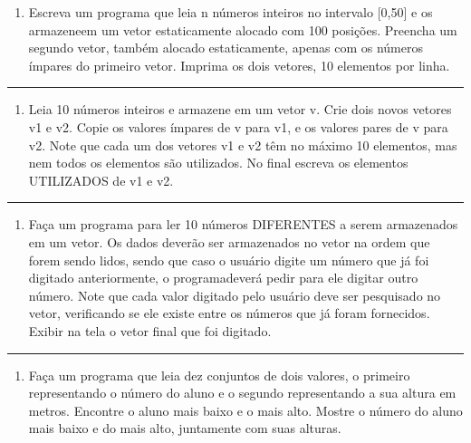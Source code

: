 \documentclass[12pt,a4paper]{article}
\renewcommand{\linethickness}{0.05em}
\providecommand{\tightlist}{%
      \setlength{\itemsep}{0pt}\setlength{\parskip}{0pt}}
\begin{document}
\begin{enumerate}
\def\labelenumi{\arabic{enumi}.}
\setcounter{enumi}{25}
\tightlist
\item
  Escreva um programa que leia n números inteiros no intervalo
  {[}0,50{]} e os armazeneem um vetor estaticamente alocado com 100
  posições. Preencha um segundo vetor, também alocado estaticamente,
  apenas com os números ímpares do primeiro vetor. Imprima os dois
  vetores, 10 elementos por linha.
\end{enumerate}

    \begin{center}\rule{0.5\linewidth}{\linethickness}\end{center}

\begin{enumerate}
\def\labelenumi{\arabic{enumi}.}
\setcounter{enumi}{26}
\tightlist
\item
  Leia 10 números inteiros e armazene em um vetor v. Crie dois novos
  vetores v1 e v2. Copie os valores ímpares de v para v1, e os valores
  pares de v para v2. Note que cada um dos vetores v1 e v2 têm no máximo
  10 elementos, mas nem todos os elementos são utilizados. No final
  escreva os elementos UTILIZADOS de v1 e v2.
\end{enumerate}

    \begin{center}\rule{0.5\linewidth}{\linethickness}\end{center}

\begin{enumerate}
\def\labelenumi{\arabic{enumi}.}
\setcounter{enumi}{27}
\tightlist
\item
  Faça um programa para ler 10 números DIFERENTES a serem armazenados em
  um vetor. Os dados deverão ser armazenados no vetor na ordem que forem
  sendo lidos, sendo que caso o usuário digite um número que já foi
  digitado anteriormente, o programadeverá pedir para ele digitar outro
  número. Note que cada valor digitado pelo usuário deve ser pesquisado
  no vetor, verificando se ele existe entre os números que já foram
  fornecidos. Exibir na tela o vetor final que foi digitado.
\end{enumerate}

    \begin{center}\rule{0.5\linewidth}{\linethickness}\end{center}

\begin{enumerate}
\def\labelenumi{\arabic{enumi}.}
\setcounter{enumi}{28}
\tightlist
\item
  Faça um programa que leia dez conjuntos de dois valores, o primeiro
  representando o número do aluno e o segundo representando a sua altura
  em metros. Encontre o aluno mais baixo e o mais alto. Mostre o número
  do aluno mais baixo e do mais alto, juntamente com suas alturas.
\end{enumerate}
\end{document}

